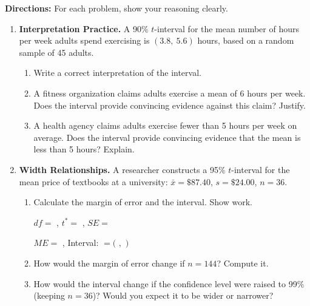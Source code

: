 \documentclass[10pt]{article}
\begin{document}
\namedateperiod

\vspace{0.1in}
\textbf{Directions:} For each problem, show your reasoning clearly.

\begin{enumerate}

  \item \textbf{Interpretation Practice.} A 90\% $t$-interval for the mean
        number of hours per week adults spend exercising is $(3.8,\ 5.6)$ hours,
        based on a random sample of 45 adults.

        \begin{enumerate}[label=\alph*.]
          \item Write a correct interpretation of the interval. 

          \item A fitness organization claims adults exercise a mean of 6 hours per
                week. Does the interval provide convincing evidence against this
                claim? Justify. 

          \item A health agency claims adults exercise fewer than 5 hours per week
                on average. Does the interval provide convincing evidence that the
                mean is less than 5 hours? Explain. 
        \end{enumerate}

  \item \textbf{Width Relationships.} A researcher constructs a 95\% $t$-interval
        for the mean price of textbooks at a university: $\bar x = \$87.40$,
        $s = \$24.00$, $n = 36$.

        \begin{enumerate}[label=\alph*.]
          \item Calculate the margin of error and the interval. Show work.
                \vspace{0.1in}

                $df = $ \blank{2cm}, $t^* = $ \blank{2.5cm}, $SE = $ \blank{2.5cm}

                $ME = $ \blank{3cm}, Interval: \blank{5cm} $= ($ \blank{2cm}$,$ \blank{2cm}$)$

          \item How would the margin of error change if $n = 144$? Compute it.

          \item How would the interval change if the confidence level were raised to
                99\% (keeping $n = 36$)? Would you expect it to be wider or narrower?
        \end{enumerate}


\end{enumerate}
\end{document}
